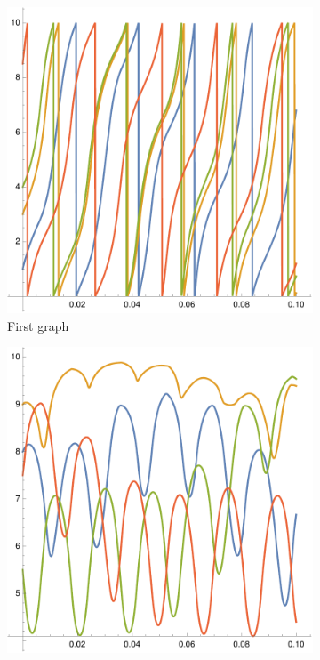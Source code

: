 \documentclass[english,master]{liumaiex}
\theoremstyle{plain}
\theoremstyle{definition}
\begin{document}
\begin{figure}[H]
	\begin{subfigure}{0.3\textwidth}
        \includegraphics[width=\textwidth]{graphs/per4N/x.pdf}
        \caption{First graph}
    \end{subfigure}
	\hfill
	\begin{subfigure}{0.3\textwidth}
        \includegraphics[width=\textwidth]{graphs/per4N/xDist.pdf}

\end{subfigure}
\end{figure}
\end{document}
